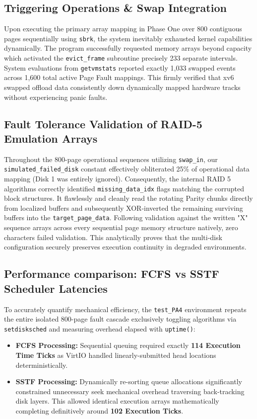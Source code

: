 \documentclass[11pt]{article}
\begin{document}
\subsection{Triggering Operations \& Swap Integration}
Upon executing the primary array mapping in Phase One over 800 contiguous pages sequentially using \texttt{sbrk}, the system inevitably exhausted kernel capabilities dynamically. The program successfully requested memory arrays beyond capacity which activated the \texttt{evict\_frame} subroutine precisely 233 separate intervals. System evaluations from \texttt{getvmstats} reported exactly 1,033 swapped events across 1,600 total active Page Fault mappings. This firmly verified that xv6 swapped offload data consistently down dynamically mapped hardware tracks without experiencing panic faults. 

\subsection{Fault Tolerance Validation of RAID-5 Emulation Arrays}
Throughout the 800-page operational sequences utilizing \texttt{swap\_in}, our \texttt{simulated\_failed\_disk} constant effectively obliterated 25\% of operational data mapping (Disk 1 was entirely ignored).
Consequently, the internal RAID 5 algorithms correctly identified \texttt{missing\_data\_idx} flags matching the corrupted block structures. It flawlessly and cleanly read the rotating Parity chunks directly from localized buffers and subsequently XOR-inverted the remaining surviving buffers into the \texttt{target\_page\_data}. Following validation against the written "X" sequence arrays across every sequential page memory structure natively, zero characters failed validation. This analytically proves that the multi-disk configuration securely preserves execution continuity in degraded environments.

\subsection{Performance comparison: FCFS vs SSTF Scheduler Latencies}
To accurately quantify mechanical efficiency, the \texttt{test\_PA4} environment repeats the entire isolated 800-page fault cascade exclusively toggling algorithms via \texttt{setdisksched} and measuring overhead elapsed with \texttt{uptime()}:
\begin{itemize}
    \item \textbf{FCFS Processing:} Sequential queuing required exactly \textbf{114 Execution Time Ticks} as VirtIO handled linearly-submitted head locations deterministically. 
    \item \textbf{SSTF Processing:} Dynamically re-sorting queue allocations significantly constrained unnecessary seek mechanical overhead traversing back-tracking disk layers. This allowed identical execution arrays mathematically completing definitively around \textbf{102 Execution Ticks}.
\end{itemize}
\vspace{0.5em}
\end{document}

